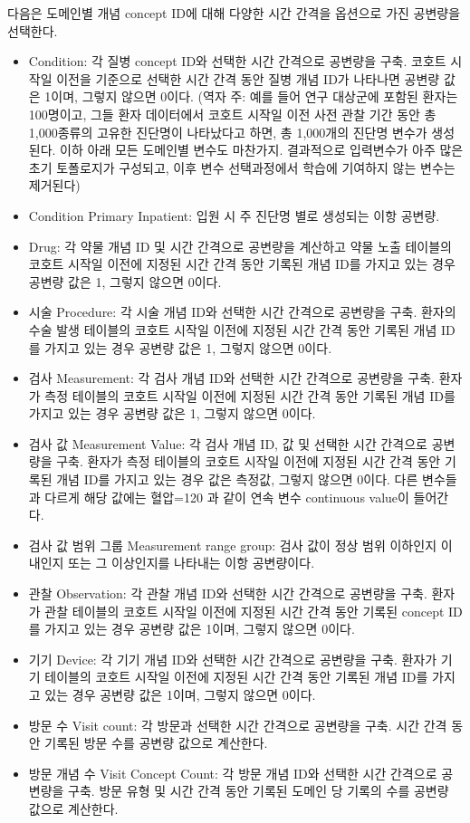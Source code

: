 \documentclass[10.5pt]{book}
\providecommand{\tightlist}{%
  \setlength{\itemsep}{0pt}\setlength{\parskip}{0pt}}
\theoremstyle{definition}
\theoremstyle{definition}
\theoremstyle{definition}
\theoremstyle{remark}
\begin{document}
다음은 도메인별 개념 concept ID에 대해 다양한 시간 간격을 옵션으로 가진
공변량을 선택한다.

\begin{itemize}
\tightlist
\item
  Condition: 각 질병 concept ID와 선택한 시간 간격으로 공변량을 구축.
  코호트 시작일 이전을 기준으로 선택한 시간 간격 동안 질병 개념 ID가
  나타나면 공변량 값은 1이며, 그렇지 않으면 0이다. (역자 주: 예를 들어
  연구 대상군에 포함된 환자는 100명이고, 그들 환자 데이터에서 코호트
  시작일 이전 사전 관찰 기간 동안 총 1,000종류의 고유한 진단명이
  나타났다고 하면, 총 1,000개의 진단명 변수가 생성된다. 이하 아래 모든
  도메인별 변수도 마찬가지. 결과적으로 입력변수가 아주 많은 초기
  토폴로지가 구성되고, 이후 변수 선택과정에서 학습에 기여하지 않는
  변수는 제거된다)
\item
  Condition Primary Inpatient: 입원 시 주 진단명 별로 생성되는 이항
  공변량.
\item
  Drug: 각 약물 개념 ID 및 시간 간격으로 공변량을 계산하고 약물 노출
  테이블의 코호트 시작일 이전에 지정된 시간 간격 동안 기록된 개념 ID를
  가지고 있는 경우 공변량 값은 1, 그렇지 않으면 0이다.
\item
  시술 Procedure: 각 시술 개념 ID와 선택한 시간 간격으로 공변량을 구축.
  환자의 수술 발생 테이블의 코호트 시작일 이전에 지정된 시간 간격 동안
  기록된 개념 ID를 가지고 있는 경우 공변량 값은 1, 그렇지 않으면 0이다.
\item
  검사 Measurement: 각 검사 개념 ID와 선택한 시간 간격으로 공변량을
  구축. 환자가 측정 테이블의 코호트 시작일 이전에 지정된 시간 간격 동안
  기록된 개념 ID를 가지고 있는 경우 공변량 값은 1, 그렇지 않으면 0이다.
\item
  검사 값 Measurement Value: 각 검사 개념 ID, 값 및 선택한 시간 간격으로
  공변량을 구축. 환자가 측정 테이블의 코호트 시작일 이전에 지정된 시간
  간격 동안 기록된 개념 ID를 가지고 있는 경우 값은 측정값, 그렇지 않으면
  0이다. 다른 변수들과 다르게 해당 값에는 혈압=120 과 같이 연속 변수
  continuous value이 들어간다.
\item
  검사 값 범위 그룹 Measurement range group: 검사 값이 정상 범위
  이하인지 이내인지 또는 그 이상인지를 나타내는 이항 공변량이다.
\item
  관찰 Observation: 각 관찰 개념 ID와 선택한 시간 간격으로 공변량을
  구축. 환자가 관찰 테이블의 코호트 시작일 이전에 지정된 시간 간격 동안
  기록된 concept ID를 가지고 있는 경우 공변량 값은 1이며, 그렇지 않으면
  0이다.
\item
  기기 Device: 각 기기 개념 ID와 선택한 시간 간격으로 공변량을 구축.
  환자가 기기 테이블의 코호트 시작일 이전에 지정된 시간 간격 동안 기록된
  개념 ID를 가지고 있는 경우 공변량 값은 1이며, 그렇지 않으면 0이다.
\item
  방문 수 Visit count: 각 방문과 선택한 시간 간격으로 공변량을 구축.
  시간 간격 동안 기록된 방문 수를 공변량 값으로 계산한다.
\item
  방문 개념 수 Visit Concept Count: 각 방문 개념 ID와 선택한 시간
  간격으로 공변량을 구축. 방문 유형 및 시간 간격 동안 기록된 도메인 당
  기록의 수를 공변량 값으로 계산한다.
\end{itemize}
\end{document}
